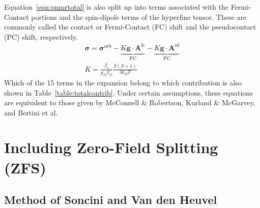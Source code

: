 \documentclass[11pt]{report}
\newcommand{\ten}{\bm}
\newcommand\fc{\mathrm{fc}}
\newcommand\sd{\mathrm{sd}}
\begin{document}
Equation~\ref{eqn:pnmrtotal} is also split up into terms associated with
the Fermi-Contact portions and the spin-dipole terms of the hyperfine tensor.
These are commonly called the contact or Fermi-Contact (FC) shift and the
pseudocontact (PC) shift, respectively.
%
\begin{gather}
\ten{\sigma} = \ten{\sigma}^{\mathrm{orb}}
               - \underbrace{K \ten{g} \cdot \ten{A}^\fc}_\mathrm{FC} 
               - \underbrace{K \ten{g} \cdot \ten{A}^\sd}_\mathrm{PC}\\
               K = \frac{\beta_e}{g_N \beta_N}\frac{S(S+1)}{3k_{B}T}
\end{gather}
%
Which of the 15 terms in the expansion belong to which contribution
is also shown in Table~\ref{table:totalcontrib}.
Under certain assumptions,
these equations are equivalent to those given by McConnell \& Robertson\cite{McConnell:1958b},
Kurland \& McGarvey\cite{Kurland:1970a}, and Bertini et al.\cite{Bertini:2002a}

\section{Including Zero-Field Splitting (ZFS)}
\label{sec:zfs}
\subsection{Method of Soncini and Van den Heuvel}
\end{document}
